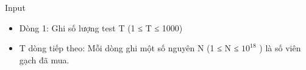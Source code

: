 Input
\begin{itemize}
	\item Dòng 1: Ghi số lượng test T (1 ≤ T ≤ 1000)
	\item T dòng tiếp theo: Mỗi dòng ghi một số nguyên N (1 ≤ N ≤ $10^{18}$ ) là số viên gạch đã mua.
\end{itemize}